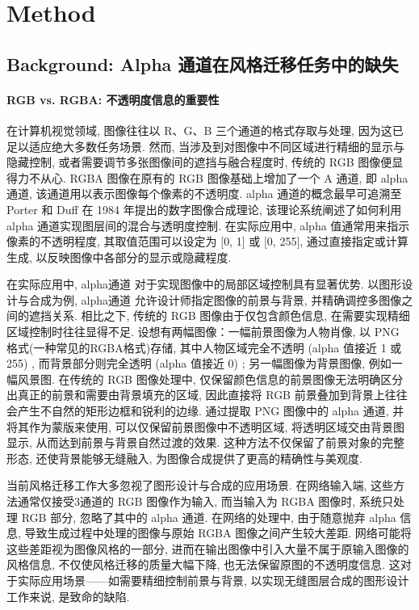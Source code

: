 \section{Method}

\subsection{Background: Alpha 通道在风格迁移任务中的缺失}

\paragraph{RGB vs. RGBA: 不透明度信息的重要性}
在计算机视觉领域, 图像往往以 R、G、B 三个通道的格式存取与处理, 因为这已足以适应绝大多数任务场景. 然而, 当涉及到对图像中不同区域进行精细的显示与隐藏控制, 或者需要调节多张图像间的遮挡与融合程度时, 传统的 RGB 图像便显得力不从心. 
RGBA 图像在原有的 RGB 图像基础上增加了一个 A 通道, 即 alpha 通道, 该通道用以表示图像每个像素的不透明度. alpha 通道的概念最早可追溯至 Porter 和 Duff 在 1984 年提出的数字图像合成理论, 该理论系统阐述了如何利用 alpha 通道实现图层间的混合与透明度控制\cite{porter1984compositing}. 在实际应用中, alpha 值通常用来指示像素的不透明程度, 其取值范围可以设定为 $[$0, 1$]$ 或 $[$0, 255$]$, 通过直接指定或计算生成, 以反映图像中各部分的显示或隐藏程度. 

在实际应用中, alpha通道 对于实现图像中的局部区域控制具有显著优势. 以图形设计与合成为例, alpha通道 允许设计师指定图像的前景与背景, 并精确调控多图像之间的遮挡关系. 相比之下, 传统的 RGB 图像由于仅包含颜色信息, 在需要实现精细区域控制时往往显得不足.
设想有两幅图像：一幅前景图像为人物肖像, 以 PNG 格式(一种常见的RGBA格式)存储, 其中人物区域完全不透明 (alpha 值接近 1 或 255) , 而背景部分则完全透明 (alpha 值接近 0) ; 另一幅图像为背景图像, 例如一幅风景图. 在传统的 RGB 图像处理中, 仅保留颜色信息的前景图像无法明确区分出真正的前景和需要由背景填充的区域, 因此直接将 RGB 前景叠加到背景上往往会产生不自然的矩形边框和锐利的边缘. 通过提取 PNG 图像中的 alpha 通道, 并将其作为蒙版来使用, 可以仅保留前景图像中不透明区域, 将透明区域交由背景图显示, 从而达到前景与背景自然过渡的效果. 这种方法不仅保留了前景对象的完整形态, 还使背景能够无缝融入, 为图像合成提供了更高的精确性与美观度. 

当前风格迁移工作\cite{johnson2016perceptual,risser2017stable,sanakoyeu2018style,jing2019neural,goodfellow2020generative,li2023frequency,fu2023neural,tang2022few,kwon2024aesfa}大多忽视了图形设计与合成的应用场景. 在网络输入端, 这些方法通常仅接受3通道的 RGB 图像作为输入, 而当输入为 RGBA 图像时, 系统只处理 RGB 部分, 忽略了其中的 alpha 通道. 在网络的处理中, 由于随意抛弃 alpha 信息, 导致生成过程中处理的图像与原始 RGBA 图像之间产生较大差距. 网络可能将这些差距视为图像风格的一部分, 进而在输出图像中引入大量不属于原输入图像的风格信息, 不仅使风格迁移的质量大幅下降, 也无法保留原图的不透明度信息. 这对于实际应用场景——如需要精细控制前景与背景, 以实现无缝图层合成的图形设计工作来说, 是致命的缺陷. 

